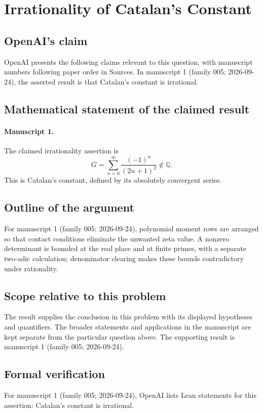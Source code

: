 \documentclass[11pt]{article}
\begin{document}
\section*{Irrationality of Catalan’s Constant}

\subsection{OpenAI's claim}
OpenAI presents the following claims relevant to this question, with manuscript numbers following paper order in Sources. In manuscript 1 (family 005; 2026-09-24), the asserted result is that Catalan's constant is irrational.

\subsection{Mathematical statement of the claimed result}
\paragraph{Manuscript 1.}
The claimed irrationality assertion is
\[
 G=\sum_{n=0}^{\infty}\frac{(-1)^n}{(2n+1)^2}\notin\mathbb Q.
\]
This is Catalan's constant, defined by its absolutely convergent series.

\subsection{Outline of the argument}
For manuscript 1 (family 005; 2026-09-24), polynomial moment rows are arranged so that contact conditions eliminate the unwanted zeta value. A nonzero determinant is bounded at the real place and at finite primes, with a separate two-adic calculation; denominator clearing makes these bounds contradictory under rationality.

\subsection{Scope relative to this problem}
The result supplies the conclusion in this problem with its displayed hypotheses and quantifiers. The broader statements and applications in the manuscript are kept separate from the particular question above. The supporting result is manuscript 1 (family 005; 2026-09-24).

\subsection{Formal verification}
For manuscript 1 (family 005; 2026-09-24), OpenAI lists Lean statements for this assertion: Catalan's constant is irrational.
\end{document}
